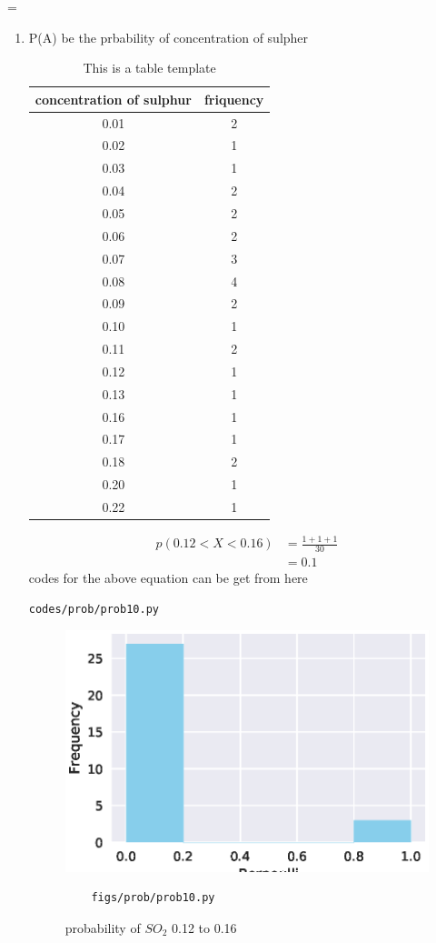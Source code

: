 =\renewcommand{\theequation}{\theenumi}
\begin{enumerate}[label=\arabic*.,ref=\thesubsection.\theenumi]
\item P(A) be the prbability of concentration of sulpher

\begin{table}[!ht]
\begin{tabular}{ |c|c| } 
	\hline
	\textbf{concentration of sulphur} &\textbf{friquency}\\
	\hline
	0.01 &2\\ 
	0.02 &1\\ 
	0.03 &1\\ 
	0.04 &2\\ 
	0.05 &2\\ 
	0.06 &2\\ 
	0.07 &3\\
	0.08 &4\\ 
	0.09 &2\\ 
	0.10 &1\\ 
	0.11 &2\\ 
	0.12 &1\\ 
	0.13 &1\\ 
	0.16 &1\\ 
	0.17 &1\\ 
	0.18 &2\\ 
	0.20 &1\\ 
	0.22 &1\\   
	\hline
\end{tabular}	
	\caption{This is a table template}
	\label{tab:template}
\end{table}
\begin{align}
p\left(0.12 < X < 0.16\right) &= \frac{1+1+1}{30}
\\
&= 0.1
\end{align}
codes for the above equation can be get from here
\begin{lstlisting}
codes/prob/prob10.py
\end{lstlisting}
\begin{figure}[!ht]
	\centering
	\includegraphics[width=\columnwidth]{./figures/prob/prob10.eps}
	\caption{probability of $SO_2$ 0.12 to 0.16 }
	\label{fig:bt9}
	\begin{lstlisting}
	figs/prob/prob10.py
	\end{lstlisting}
\end{figure}
\end{enumerate}